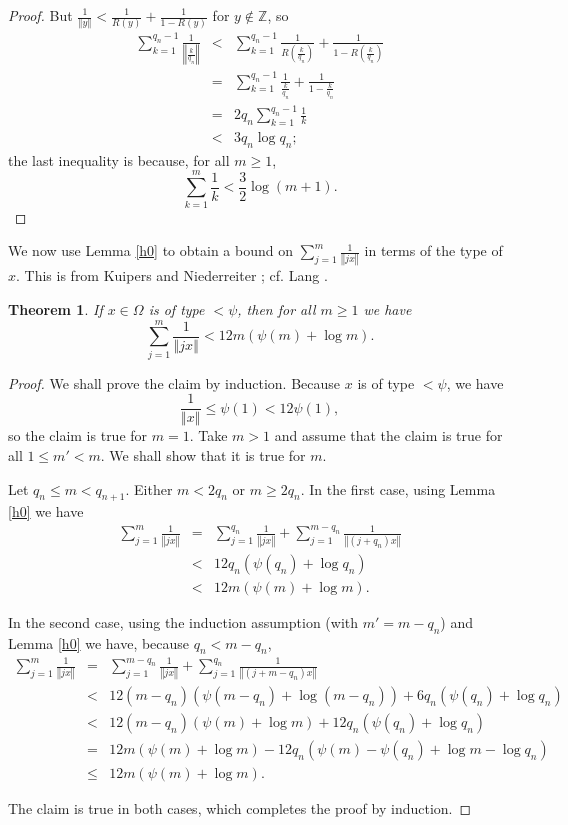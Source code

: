 \documentclass{amsart}
\newcommand{\norm}[1]{\left\Vert #1 \right\Vert}
\newtheorem{theorem}{Theorem}
\begin{document}
\begin{proof}
But $\frac{1}{\norm{y}}<\frac{1}{R(y)}+\frac{1}{1-R(y)}$ for $y \not \in \mathbb{Z}$, so
\begin{eqnarray*}
\sum_{k=1}^{q_n-1} \frac{1}{\norm{\frac{k}{q_n}}}&<&\sum_{k=1}^{q_n-1} \frac{1}{R\left( \frac{k}{q_n} \right)}
+\frac{1}{1-R\left( \frac{k}{q_n} \right)}\\
&=&\sum_{k=1}^{q_n-1} \frac{1}{\frac{k}{q_n}}+\frac{1}{1-\frac{k}{q_n}}\\
&=&2q_n \sum_{k=1}^{q_n-1} \frac{1}{k}\\
&<&3 q_n \log q_n;
\end{eqnarray*}
the last inequality is because, for all $m \geq 1$,
\[
\sum_{k=1}^m \frac{1}{k} < \frac{3}{2}\log(m+1).
\]
\end{proof}







We now use Lemma \ref{h0} to obtain a bound on $\sum_{j=1}^m \frac{1}{\norm{jx}}$  in terms of the type of $x$. This is from Kuipers and Niederreiter \cite[p.~131, Exercise 3.11]{kuipers};
cf. Lang \cite[p.~39, Theorem 2]{MR0209227}.

\begin{theorem}
If $x \in \Omega$ is of type $<\psi$, then for all $m \geq 1$ we have
\[
\sum_{j=1}^m \frac{1}{\norm{jx}}<12m(\psi(m)+\log m).
\]
\label{jalpha}
\end{theorem}
\begin{proof}
We shall prove the claim by induction. Because $x$ is of type $<\psi$, we have
\[
\frac{1}{\norm{x}} \leq \psi(1)<12\psi(1),
\]
so the claim is true for $m=1$. Take $m>1$ and assume that the claim is true for all $1 \leq m'<m$. We shall show that it is true for $m$.

Let $q_n \leq m < q_{n+1}$. Either $m < 2q_n$ or $m \geq 2q_n$.
In the first case, using Lemma \ref{h0}  we have
\begin{eqnarray*}
\sum_{j=1}^m \frac{1}{\norm{jx}}&=&\sum_{j=1}^{q_n} \frac{1}{\norm{jx}}+\sum_{j=1}^{m-q_n} \frac{1}{\norm{(j+q_n)x}}\\
&<&12 q_n(\psi(q_n)+\log q_n)\\
&<&12m(\psi(m)+\log m).
\end{eqnarray*}

In the second case, using the induction assumption (with $m'=m-q_n$) and Lemma \ref{h0} we have, because $q_n<m-q_n$,
\begin{eqnarray*}
\sum_{j=1}^m \frac{1}{\norm{jx}}&=&\sum_{j=1}^{m-q_n} \frac{1}{\norm{jx}}+\sum_{j=1}^{q_n} \frac{1}{\norm{(j +m-q_n)x}}\\
&<&12(m-q_n)\left(\psi(m-q_n)+\log(m-q_n)\right)+6q_n(\psi(q_n)+\log q_n)\\
&<&12(m-q_n)\left(\psi(m)+\log m \right)+12q_n(\psi(q_n)+\log q_n)\\
&=&12m(\psi(m)+\log m)-12q_n\left(\psi(m)-\psi(q_n)+\log m - \log q_n\right)\\
&\leq&12m(\psi(m)+\log m).
\end{eqnarray*}

The claim is true in both cases, which completes the proof by induction.
\end{proof}
\end{document}
